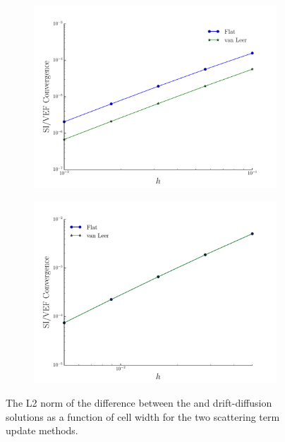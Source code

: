 	\begin{figure}
		\centering
		\begin{subfigure}{.5\textwidth}
			\centering
			\includegraphics[width=\textwidth]{figs/solconv_homo.pdf}
			\caption{}
			\label{fig:homo}
		\end{subfigure}
		\hspace{-2em}
		\begin{subfigure}{.5\textwidth}
			\centering
			\includegraphics[width=\textwidth]{figs/solconv_reed.pdf}
			\caption{}
			\label{fig:reed}
		\end{subfigure}
		\caption{The L2 norm of the difference between the \SN and drift-diffusion solutions as a function of cell width for the two scattering term update methods. }
	\end{figure}

